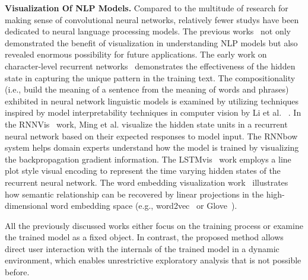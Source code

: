\textbf{Visualization Of NLP Models.}
Compared to the multitude of research for making sense of convolutional neural networks, relatively fewer studys have been dedicated to neural language processing models.
%
The previous works~\cite{KarpathyJohnson2015, LiChenHovy2015, StrobeltGehrmannPfister2018, LiuBremerJayaraman2018} not only demonstrated the benefit of visualization in understanding NLP models but also revealed enormous possibility for future applications.
The early work on character-level recurrent networks~\cite{KarpathyJohnson2015} demonstrates the effectiveness of the hidden state in capturing the unique pattern in the training text. The compositionality (i.e., build the meaning of a sentence from the meaning of words and phrases) exhibited in neural network linguistic models is examined by utilizing techniques inspired by model interpretability techniques in computer vision by Li et al. ~\cite{LiChenHovy2015}.
In the RNNVis~\cite{MingCaoZhang2017} work, Ming et al. visualize the hidden state units in a recurrent neural network based on their expected responses to model input.
The RNNbow~\cite{CashmanPattersonMosca2017} system helps domain experts understand how the model is trained by visualizing the backpropagation gradient information.
The LSTMvis~\cite{StrobeltGehrmannPfister2018} work employs a line plot style visual encoding to represent the time varying hidden states of the recurrent neural network. The word embedding visualization work~\cite{LiuBremerJayaraman2018} illustrates how semantic relationship can be recovered by linear projections in the high-dimensional word embedding space (e.g., word2vec~\cite{MikolovSutskeverChen2013} or Glove~\cite{PenningtonSocherManning2014}).

All the previously discussed works either focus on the training process or examine the trained model as a fixed object. In contrast, the proposed method allows direct user interaction with the internals of the trained model in a dynamic environment, which enables unrestrictive exploratory analysis that is not possible before.

